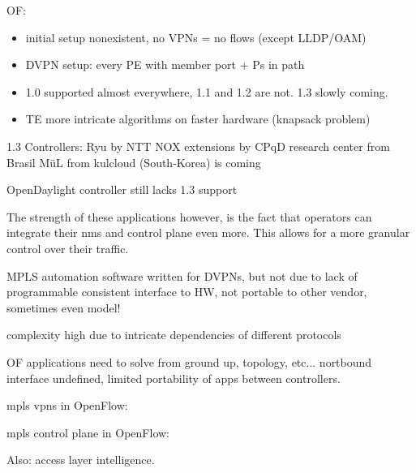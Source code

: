 OF:
\begin{itemize}
	\item initial setup nonexistent, no VPNs = no flows (except LLDP/OAM)
	\item DVPN setup: every PE with member port + Ps in path
	\item 1.0 supported almost everywhere, 1.1 and 1.2 are not. 1.3 slowly coming. 
	\item TE more intricate algorithms on faster hardware (knapsack problem)
\end{itemize}

1.3 Controllers:
Ryu by NTT \cite{ryu}
NOX extensions by CPqD research center from Brasil \cite{cpqd}
M\"{u}L from kulcloud (South-Korea) is coming \cite{mul}

OpenDaylight controller still lacks 1.3 support

\HRule

The strength of these applications however, is the fact that operators can integrate their \ac{nms} and control plane even more. This allows for a more granular control over their traffic.

MPLS automation software written for DVPNs, but not due to lack of programmable consistent interface to HW, not portable to other vendor, sometimes even model!

complexity high due to intricate dependencies of different protocols

\HRule

OF applications need to solve from ground up, topology, etc... nortbound interface undefined, limited portability of apps between controllers. 


\ac{mpls} \acp{vpn} in OpenFlow: \cite{mpls-vpn-openflow}

\ac{mpls} control plane in OpenFlow: \cite{mpls-open}

Also: access layer intelligence.












